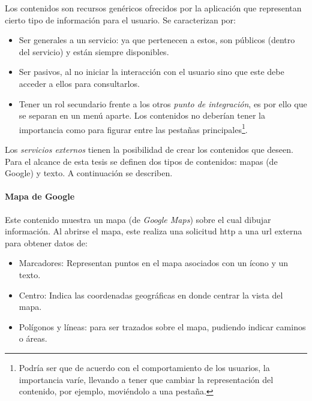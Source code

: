 Los contenidos son recursos genéricos ofrecidos por la aplicación que representan cierto tipo de información para el usuario. Se caracterizan por:
\begin{itemize}
\item Ser generales a un servicio: ya que pertenecen a estos, son públicos (dentro del servicio) y están siempre disponibles.
\item Ser pasivos, al no iniciar la interacción con el usuario sino que este debe acceder a ellos para consultarlos.
\item Tener un rol secundario frente a los otros \textit{punto de integración}, es por ello que se separan en un menú aparte. Los contenidos no deberían tener la importancia como para figurar entre las pestañas principales\footnote{Podría ser que de acuerdo con el comportamiento de los usuarios, la importancia varíe, llevando a tener que cambiar la representación del contenido, por ejemplo, moviéndolo a una pestaña.}.
\end{itemize}


Los \textit{servicios externos} tienen la posibilidad de crear los contenidos que deseen. Para el alcance de esta tesis se definen dos tipos de contenidos: mapas (de Google) y texto. A continuación se describen.

\paragraph{Mapa de Google}
\label{funcionalidad_contenidos_mapa} 

Este contenido muestra un mapa (de \textit{Google Maps}) sobre el cual dibujar información. Al abrirse el mapa, este realiza una solicitud \gls{http} a una \gls{url} externa para obtener datos de:
\begin{itemize}
\item Marcadores: Representan puntos en el mapa asociados con un ícono y un texto.
\item Centro: Indica las coordenadas geográficas en donde centrar la vista del mapa.
\item Polígonos y líneas: para ser trazados sobre el mapa, pudiendo indicar caminos o áreas.
\end{itemize}

